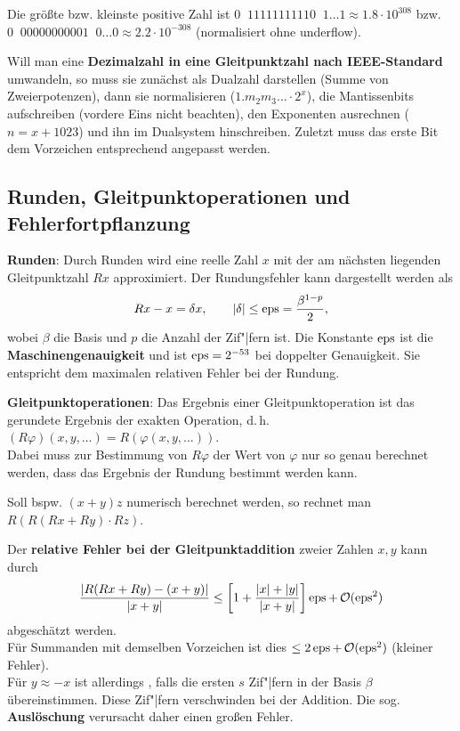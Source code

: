 Die größte bzw. kleinste positive Zahl ist
$0\;\;11111111110\;\;1 \ldots 1 \approx 1.8 \cdot 10^{308}$ bzw. \\
$0\;\;00000000001\;\;0 \ldots 0 \approx 2.2 \cdot 10^{-308}$
(normalisiert ohne underflow).

Will man eine
\textbf{Dezimalzahl in eine Gleitpunktzahl nach IEEE-Standard}
umwandeln, so muss sie zunächst als Dualzahl darstellen
(Summe von Zweierpotenzen), dann sie normalisieren
($1.m_2 m_3\ldots \cdot 2^x$), die Mantissenbits aufschreiben (vordere Eins
nicht beachten), den Exponenten ausrechnen ($n = x + 1023$)
und ihn im Dualsystem hinschreiben.
Zuletzt muss das erste Bit dem Vorzeichen entsprechend angepasst werden.

\pagebreak

\subsection{%
    Runden, Gleitpunktoperationen und Fehlerfortpflanzung%
}

\textbf{Runden}:
Durch Runden wird eine reelle Zahl $x$ mit der am nächsten liegenden
Gleitpunktzahl $Rx$ approximiert.
Der Rundungsfehler kann dargestellt werden als
\begin{align*}
    Rx - x = \delta x, \qquad
    |\delta| \le \operatorname{eps} = \frac{\beta^{1-p}}{2},
\end{align*}
wobei $\beta$ die Basis und $p$ die Anzahl der Zif"|fern ist.
Die Konstante $\operatorname{eps}$ ist die \textbf{Maschinengenauigkeit} und ist
$\operatorname{eps} = 2^{-53}$ bei doppelter Genauigkeit.
Sie entspricht dem maximalen relativen Fehler bei der Rundung.

\textbf{Gleitpunktoperationen}:
Das Ergebnis einer Gleitpunktoperation ist das gerundete Ergebnis
der exakten Operation, d.\,h.
$(R \varphi)(x, y, \ldots) = R(\varphi(x, y, \ldots))$. \\
Dabei muss zur Bestimmung von $R \varphi$ der Wert von $\varphi$ nur so genau
berechnet werden, dass das Ergebnis der Rundung bestimmt werden kann.

Soll bspw. $(x + y) z$ numerisch berechnet werden, so rechnet man
$R(R(Rx + Ry) \cdot Rz)$.

\linie

Der \textbf{relative Fehler bei der Gleitpunktaddition} zweier Zahlen
$x, y$ kann durch
\begin{align*}
    \frac{|R(Rx + Ry) - (x + y)|}{|x + y|}
    \le \left[1 + \frac{|x| + |y|}{|x + y|}\right] \operatorname{eps} + \operatorname{\mathcal{O}}(\operatorname{eps}^2)
\end{align*}
abgeschätzt werden. \\
Für Summanden mit demselben Vorzeichen ist dies $\le 2\operatorname{eps} + \operatorname{\mathcal{O}}(\operatorname{eps}^2)$
(kleiner Fehler). \\
Für $y \approx -x$ ist allerdings
, falls
die ersten $s$ Zif"|fern in der Basis $\beta$ übereinstimmen.
Diese Zif"|fern verschwinden bei der Addition.
Die sog. \textbf{Auslöschung} verursacht daher einen großen Fehler.


